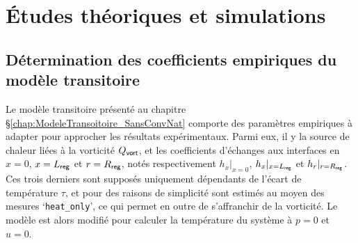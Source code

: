\chapter{\'Etudes théoriques et simulations}
\mylocaltoc

\section{Détermination des coefficients empiriques du modèle transitoire}

Le modèle transitoire présenté au chapitre §\ref{chap:ModeleTransoitoire_SansConvNat} comporte des paramètres empiriques à adapter pour approcher les résultats expérimentaux. Parmi eux, il y la source de chaleur liées à la vorticité $Q_{\sf vort}$, et les coefficients d'échanges aux interfaces en $x=0$, $x=L_{\sf reg}$ et $r=R_{\sf reg}$, notés respectivement $h_{x}|_{x=0}$, $h_{x}|_{x=L_{\sf reg}}$ et $h_{r}|_{r=R_{\sf reg}}$. Ces trois derniers sont supposés uniquement dépendants de l'écart de température $\tau$, et pour des raisons de simplicité sont estimés au moyen des mesures `\texttt{heat\_only}', ce qui permet en outre de s'affranchir de la vorticité. Le modèle est alors modifié pour calculer la température du système à $p=0$ et $u=0$.